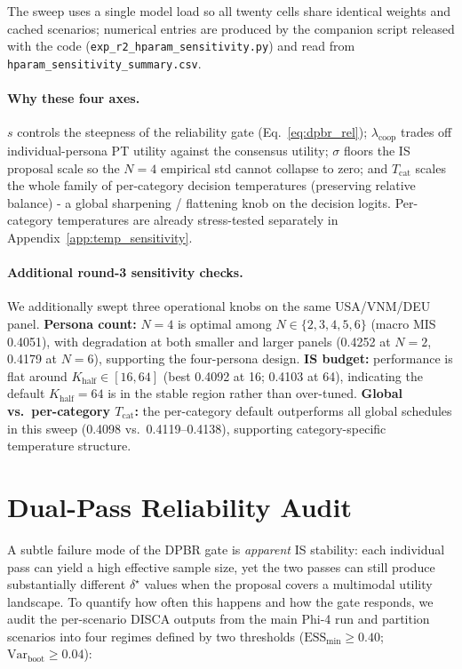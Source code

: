 \documentclass{article}
\begin{document}
The sweep uses a single model load so all twenty cells share identical
weights and cached scenarios; numerical entries are produced by the
companion script released with the code
(\texttt{exp\_r2\_hparam\_sensitivity.py}) and read from
\texttt{hparam\_sensitivity\_summary.csv}.

\paragraph{Why these four axes.} $s$ controls the steepness of the
reliability gate (Eq.~\ref{eq:dpbr_rel}); $\lambda_{\text{coop}}$ trades
off individual-persona PT utility against the consensus utility;
$\sigma$ floors the IS proposal scale so the $N{=}4$ empirical std
cannot collapse to zero; and $T_{\text{cat}}$ scales the whole family of
per-category decision temperatures (preserving relative balance) - a
global sharpening / flattening knob on the decision logits. Per-category
temperatures are already stress-tested separately in
Appendix~\ref{app:temp_sensitivity}.

\paragraph{Additional round-3 sensitivity checks.}
We additionally swept three operational knobs on the same
USA/VNM/DEU panel. \textbf{Persona count:} $N{=}4$ is optimal among
$N\in\{2,3,4,5,6\}$ (macro MIS 0.4051), with degradation at both smaller
and larger panels (0.4252 at $N{=}2$, 0.4179 at $N{=}6$), supporting the
four-persona design. \textbf{IS budget:} performance is flat around
$K_{\text{half}}\in[16,64]$ (best 0.4092 at 16; 0.4103 at 64), indicating
the default $K_{\text{half}}{=}64$ is in the stable region rather than
over-tuned. \textbf{Global vs.\ per-category $T_{\text{cat}}$:} the
per-category default outperforms all global schedules in this sweep
(0.4098 vs.\ 0.4119--0.4138), supporting category-specific temperature
structure.

\section{Dual-Pass Reliability Audit}
\label{app:r2_reliability_audit}

A subtle failure mode of the DPBR gate is \emph{apparent} IS stability:
each individual pass can yield a high effective sample size, yet the two
passes can still produce substantially different $\delta^\star$ values when
the proposal covers a multimodal utility landscape. To quantify how often
this happens and how the gate responds, we audit the per-scenario DISCA
outputs from the main Phi-4 run and partition scenarios into four regimes
defined by two thresholds
($\text{ESS}_{\min} \geq 0.40$; $\mathrm{Var}_{\text{boot}} \geq 0.04$):
\end{document}
